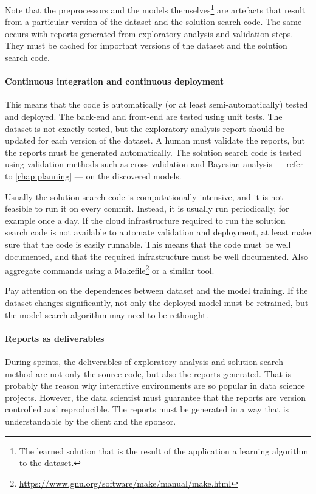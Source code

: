 Note that the preprocessors and the models themselves\footnote{The learned
solution that is the result of the application a learning algorithm to the dataset.} are
artefacts that result from a particular version of the dataset and the solution search
code.  The same occurs with reports generated from exploratory analysis and validation
steps.  They must be cached for important versions of the dataset and the solution search
code.

\paragraph{Continuous integration and continuous deployment}


This means that the code is
automatically (or at least semi-automatically) tested and deployed.  The back-end and
front-end are tested using unit tests.  The dataset is not exactly tested, but the
exploratory analysis report should be updated for each version of the dataset.
A human must validate the reports, but the reports must be generated automatically.
The solution search code is tested using
validation methods such as cross-validation and Bayesian analysis --- refer to
\cref{chap:planning} --- on the discovered models.

Usually the solution search code is computationally intensive, and it is
not feasible to run it on every commit.  Instead, it is usually run periodically, for example
once a day.  If the cloud infrastructure required to run the solution search code is not
available to automate validation and deployment, at least make sure that the code is
easily runnable.  This means that the code must be well documented, and that the
required infrastructure must be well documented.  Also aggregate commands using a
Makefile\footnote{\url{https://www.gnu.org/software/make/manual/make.html}} or a similar tool.

Pay attention on the dependences between dataset and the
model training.  If the dataset changes significantly, not only the deployed model
must be retrained, but the model search algorithm may need to be rethought.

\paragraph{Reports as deliverables}

During sprints, the deliverables of exploratory analysis and solution search method are
not only the source code, but also the reports generated.  That is probably the reason why
interactive environments are so popular in data science projects.  However, the data
scientist must guarantee that the reports are version controlled and reproducible.  The
reports must be generated in a way that is understandable by the client and the sponsor.

